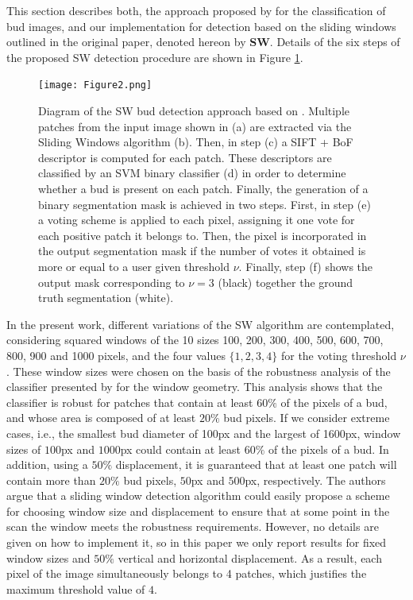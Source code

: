 \documentclass[a4paper,authoryear,review]{elsarticle}
\begin{document}
This section describes both, the approach proposed by \citet{perez2017image} for the classification of bud images, and our implementation for detection based on the sliding windows outlined in the original paper, denoted hereon by \textbf{SW}. Details of the six steps of the proposed SW detection procedure are shown in Figure \ref{fig:SW}. 


\begin{figure}
    \centering
    \texttt{[image: Figure2.png]}
\caption{
Diagram of the SW bud detection approach based on \citet{perez2017image}. Multiple patches from the input image shown in (a) are extracted via the Sliding Windows algorithm (b). Then, in step (c) a SIFT + BoF descriptor is computed for each patch. These descriptors are classified by an SVM binary classifier (d) in order to determine whether a bud is present on each patch. Finally, the generation of a binary segmentation mask is achieved in two steps. First, in step (e) a voting scheme is applied to each pixel, assigning it one vote for each positive patch it belongs to. Then, the pixel is incorporated in the output segmentation mask if the number of votes it obtained is more or equal to a user given threshold $\nu$. Finally, step (f) shows the output mask corresponding to $\nu=3$ (black) together the ground truth segmentation (white).}
    \label{fig:SW}
\end{figure}

In the present work, different variations of the SW algorithm are contemplated, considering squared windows of the 10 sizes 100, 200, 300, 400, 500, 600, 700, 800, 900 and 1000 pixels, and the four values $\{1, 2, 3, 4\}$ for the voting threshold $\nu$. 
%
These window sizes were chosen on the basis of the robustness analysis of the classifier presented by \citet{perez2017image} for the window geometry. This analysis shows that the classifier is robust for patches that contain at least $60\%$ of the pixels of a bud, and whose area is composed of at least $20\%$ bud pixels. If we consider extreme cases, i.e., the smallest bud diameter of 100px and the largest of 1600px, window sizes of $100$px and $1000$px could contain at least $60\%$ of the pixels of a bud. In addition, using a $50\%$ displacement, it is guaranteed that at least one patch will contain more than $20\%$ bud pixels, $50$px and $500$px, respectively. The authors argue that a sliding window detection algorithm could easily propose a scheme for choosing window size and displacement to ensure that at some point in the scan the window meets the robustness requirements. 
However, no details are given on how to implement it, so in this paper we only report results for fixed window sizes and $50\%$ vertical and horizontal displacement. As a result, each pixel of the image simultaneously belongs to 4 patches, which justifies the maximum threshold value of $4$. 
\end{document}
